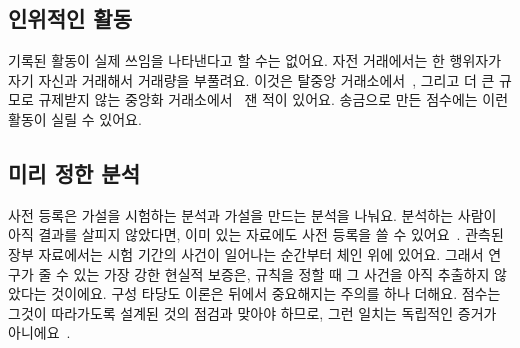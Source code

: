 \subsection{인위적인 활동}

기록된 활동이 실제 쓰임을 나타낸다고 할 수는 없어요. 자전 거래에서는 한 행위자가 자기 자신과 거래해서 거래량을 부풀려요. 이것은 탈중앙 거래소에서~\cite{victor2021washtrading}, 그리고 더 큰 규모로 규제받지 않는 중앙화 거래소에서~\cite{cong2023washtrading} 잰 적이 있어요. 송금으로 만든 점수에는 이런 활동이 실릴 수 있어요.

\subsection{미리 정한 분석}

사전 등록은 가설을 시험하는 분석과 가설을 만드는 분석을 나눠요. 분석하는 사람이 아직 결과를 살피지 않았다면, 이미 있는 자료에도 사전 등록을 쓸 수 있어요~\cite{nosek2018preregistration}. 관측된 장부 자료에서는 시험 기간의 사건이 일어나는 순간부터 체인 위에 있어요. 그래서 연구가 줄 수 있는 가장 강한 현실적 보증은, 규칙을 정할 때 그 사건을 아직 추출하지 않았다는 것이에요. 구성 타당도 이론은 뒤에서 중요해지는 주의를 하나 더해요. 점수는 그것이 따라가도록 설계된 것의 점검과 맞아야 하므로, 그런 일치는 독립적인 증거가 아니에요~\cite{cronbach1955construct}.
